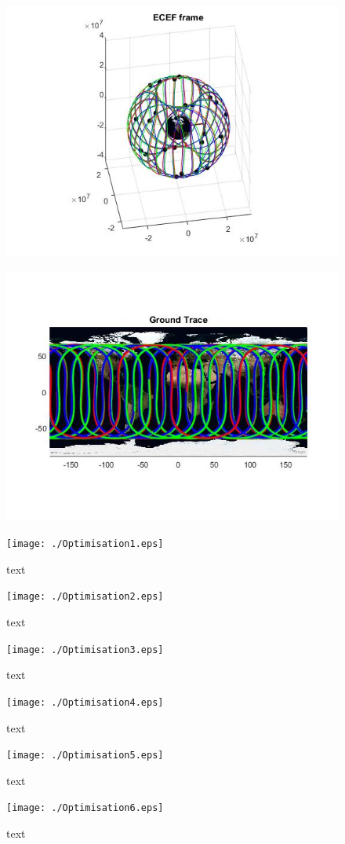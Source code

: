 \documentclass[Space3_Assign2]{subfile}
\begin{document}
\begin{figure}
\centering
\includegraphics[width=0.7\linewidth]{Q2ECEFside}
\caption{}
\label{fig:Q2ECEFside}
\end{figure}

\begin{figure}
\centering
\includegraphics[width=1\linewidth]{Q2gt}
\caption{}
\label{fig:Q2gt}
\end{figure}



\begin{figure}
\centering
\caption{text}
\label{Q2op1}
\texttt{[image: ./Optimisation1.eps]}
\end{figure}

\begin{figure}
\centering
\caption{text}
\label{Q2op2}
\texttt{[image: ./Optimisation2.eps]}
\end{figure}
\begin{figure}
\centering
\caption{text}
\label{Q2op3}
\texttt{[image: ./Optimisation3.eps]}
\end{figure}
\begin{figure}
\centering
\caption{text}
\label{Q2op4}
\texttt{[image: ./Optimisation4.eps]}
\end{figure}
\begin{figure}
\centering
\caption{text}
\label{Q2op5}
\texttt{[image: ./Optimisation5.eps]}
\end{figure}
\begin{figure}
\centering
\caption{text}
\label{Q2op6}
\texttt{[image: ./Optimisation6.eps]}
\end{figure}
\end{document}
